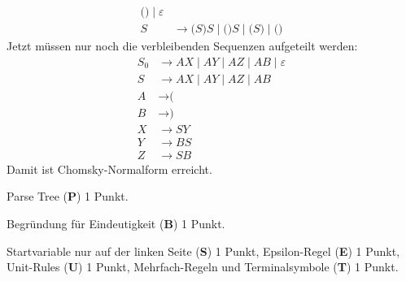 \begin{loesung}
\begin{teilaufgaben}
\begin{align*}
\texttt{(}  \texttt{)} 
\;|\;
\varepsilon
\\
S&\rightarrow
\texttt{(} S \texttt{)} S \;|\;
\texttt{(}  \texttt{)} S \;|\;
\texttt{(} S \texttt{)}  \;|\;
\texttt{(}  \texttt{)} 
\end{align*}
Jetzt müssen nur noch die verbleibenden Sequenzen aufgeteilt werden:
\begin{align*}
S_0&\rightarrow
AX \;|\;
AY \;|\;
AZ  \;|\;
AB 
\;|\;
\varepsilon
\\
S&\rightarrow
AX \;|\;
AY \;|\;
AZ  \;|\;
AB 
\\
A&\rightarrow \texttt{(}\\
B&\rightarrow \texttt{)}\\
X&\rightarrow SY \\
Y&\rightarrow BS \\
Z&\rightarrow SB
\end{align*}
Damit ist Chomsky-Normalform erreicht.
\qedhere
\end{teilaufgaben}
\end{loesung}

\begin{bewertung}
\begin{teilaufgaben}
\item
Parse Tree ({\bf P}) 1 Punkt.
\item
Begründung für Eindeutigkeit ({\bf B})  1 Punkt.
\item
Startvariable nur auf der linken Seite ({\bf S}) 1 Punkt,
Epsilon-Regel ({\bf E}) 1 Punkt,
Unit-Rules ({\bf U}) 1 Punkt,
Mehrfach-Regeln und Terminalsymbole ({\bf T}) 1 Punkt.
\end{teilaufgaben}
\end{bewertung}




